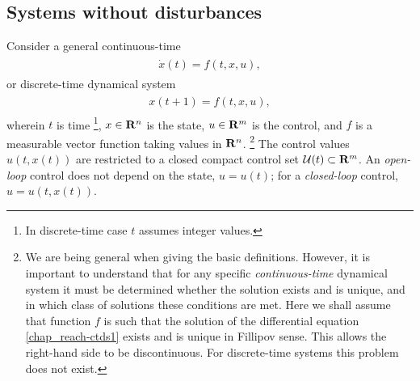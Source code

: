 \documentclass[letterpaper,10pt,english]{sphinxmanual}
\begin{document}
\subsection{Systems without disturbances}
\label{chap_reach:systems-without-disturbances}
Consider a general continuous-time
\label{chap_reach:equation-ctds1}\begin{gather}
\begin{split}\dot{x}(t) = f(t, x, u),\end{split}\label{chap_reach-ctds1}
\end{gather}
or discrete-time dynamical system
\label{chap_reach:equation-dtds1}\begin{gather}
\begin{split}x(t+1) = f(t, x, u),\end{split}\label{chap_reach-dtds1}
\end{gather}
wherein \(t\) is time \footnote{
In discrete-time case \(t\) assumes integer values.
}, \(x\in{\bf R}^n\) is the state,
\(u\in{\bf R}^m\) is the control, and \(f\) is a measurable
vector function taking values in \({\bf R}^n\). \footnote{
We are being general when giving the basic definitions. However, it
is important to understand that for any specific \emph{continuous-time}
dynamical system it must be determined whether the solution exists
and is unique, and in which class of solutions these conditions are
met. Here we shall assume that function \(f\) is such that the
solution of the differential equation \eqref{chap_reach-ctds1} exists and is unique
in Fillipov sense. This allows the right-hand side to be
discontinuous. For discrete-time systems this problem does not exist.
} The control
values \(u(t, x(t))\) are restricted to a closed compact control set
\({\mathcal U}(t)\subset{\bf R}^m\). An \emph{open-loop} control does not
depend on the state, \(u=u(t)\); for a \emph{closed-loop} control,
\(u=u(t, x(t))\).
\end{document}
